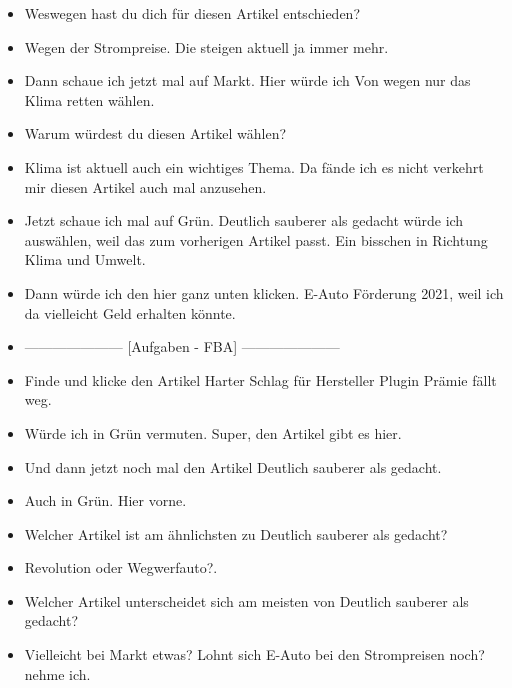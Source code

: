 {\begin{itemize}[]
                  Also \flqq Lohnt sich E-Auto bei den Strompreisen noch\frqq{}.
            \item {} Weswegen hast du dich für diesen Artikel entschieden?
            \item {} Wegen der Strompreise. Die steigen aktuell ja immer mehr.
            \item {} Dann schaue ich jetzt mal auf Markt.
                  Hier würde ich \flqq Von wegen nur das Klima retten\frqq{} wählen.
            \item {} Warum würdest du diesen Artikel wählen?
            \item {} Klima ist aktuell auch ein wichtiges Thema. Da fände ich es nicht verkehrt mir diesen Artikel auch mal anzusehen.
            \item {} Jetzt schaue ich mal auf Grün.
                  \flqq Deutlich sauberer als gedacht\frqq{} würde ich auswählen, weil das zum vorherigen Artikel passt.
                  Ein bisschen in Richtung Klima und Umwelt.
            \item {} Dann würde ich den hier ganz unten klicken. \flqq E-Auto Förderung 2021\frqq{}, weil ich da vielleicht Geld erhalten könnte.
            \item {---------------------} [Aufgaben - FBA] {---------------------}
            \item {} Finde und klicke den Artikel \flqq Harter Schlag für Hersteller Plugin Prämie fällt weg\frqq{}.
            \item {} Würde ich in Grün vermuten. Super, den Artikel gibt es hier.
            \item {} Und dann jetzt noch mal den Artikel \flqq Deutlich sauberer als gedacht\frqq{}.
            \item {} Auch in Grün. Hier vorne.
            \item {} Welcher Artikel ist am ähnlichsten zu \flqq Deutlich sauberer als gedacht\frqq{}?
            \item {} \flqq Revolution oder Wegwerfauto?\frqq{}.
            \item {} Welcher Artikel unterscheidet sich am meisten von \flqq Deutlich sauberer als gedacht\frqq{}?
            \item {} Vielleicht bei Markt etwas?
                  \flqq Lohnt sich E-Auto bei den Strompreisen noch?\frqq{} nehme ich.

\end{itemize}}
